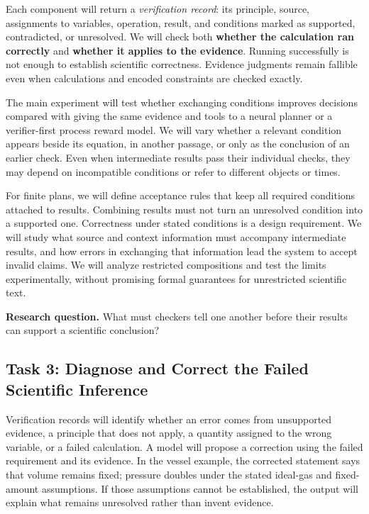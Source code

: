 \documentclass[12pt]{article}
\begin{document}
Each component will return a \emph{verification record}: its principle, source, assignments to variables, operation, result, and conditions marked as supported, contradicted, or unresolved. We will check both \textbf{whether the calculation ran correctly} and \textbf{whether it applies to the evidence}. Running successfully is not enough to establish scientific correctness. Evidence judgments remain fallible even when calculations and encoded constraints are checked exactly.

The main experiment will test whether exchanging conditions improves decisions compared with giving the same evidence and tools to a neural planner or a verifier-first process reward model. We will vary whether a relevant condition appears beside its equation, in another passage, or only as the conclusion of an earlier check. Even when intermediate results pass their individual checks, they may depend on incompatible conditions or refer to different objects or times.

For finite plans, we will define acceptance rules that keep all required conditions attached to results. Combining results must not turn an unresolved condition into a supported one. Correctness under stated conditions is a design requirement. We will study what source and context information must accompany intermediate results, and how errors in exchanging that information lead the system to accept invalid claims. We will analyze restricted compositions and test the limits experimentally, without promising formal guarantees for unrestricted scientific text.

\textbf{Research question.} What must checkers tell one another before their results can support a scientific conclusion?

\subsection*{Task 3: Diagnose and Correct the Failed Scientific Inference}

Verification records will identify whether an error comes from unsupported evidence, a principle that does not apply, a quantity assigned to the wrong variable, or a failed calculation. A model will propose a correction using the failed requirement and its evidence. In the vessel example, the corrected statement says that volume remains fixed; pressure doubles under the stated ideal-gas and fixed-amount assumptions. If those assumptions cannot be established, the output will explain what remains unresolved rather than invent evidence.
\end{document}
